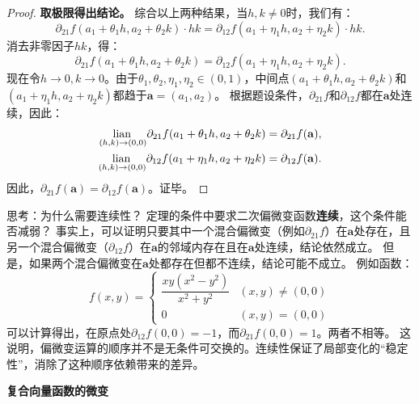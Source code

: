 \documentclass[12pt,UTF8]{ctexbook}
\begin{document}
\begin{appendix}
\begin{proof}
\textbf{取极限得出结论。}
综合以上两种结果，当$h, k \neq 0$时，我们有：
$$ \partial_{21} f(a_1 + \theta_1 h, a_2 + \theta_2 k) \cdot h k = \partial_{12} f(a_1 + \eta_1 h, a_2 + \eta_2 k) \cdot h k. $$
消去非零因子$h k$，得：
$$ \partial_{21} f(a_1 + \theta_1 h, a_2 + \theta_2 k) = \partial_{12} f(a_1 + \eta_1 h, a_2 + \eta_2 k). $$
现在令$h \to 0, k \to 0$。由于$\theta_1, \theta_2, \eta_1, \eta_2 \in (0, 1)$，中间点$(a_1 + \theta_1 h, a_2 + \theta_2 k)$和$(a_1 + \eta_1 h, a_2 + \eta_2 k)$都趋于$\mathbf{a}=(a_1, a_2)$。
根据题设条件，$\partial_{21} f$和$\partial_{12} f$都在$\mathbf{a}$处连续，因此：
\begin{align*}
\underset{(h,k)\to (0,0)}{\operatorname{lian}\,} \partial_{21} f(a_1 + \theta_1 h, a_2 + \theta_2 k) &= \partial_{21} f(\mathbf{a}), \\
\underset{(h,k)\to (0,0)}{\operatorname{lian}\,} \partial_{12} f(a_1 + \eta_1 h, a_2 + \eta_2 k) &= \partial_{12} f(\mathbf{a}).
\end{align*}
因此，$\partial_{21} f(\mathbf{a}) = \partial_{12} f(\mathbf{a})$。证毕。
\end{proof}

\begin{sk}{思考：为什么需要连续性？}
定理的条件中要求二次偏微变函数\textbf{连续}，这个条件能否减弱？
事实上，可以证明只要其中一个混合偏微变（例如$\partial_{21} f$）在$\mathbf{a}$处存在，且另一个混合偏微变（$\partial_{12} f$）在$\mathbf{a}$的邻域内存在且在$\mathbf{a}$处连续，结论依然成立。
但是，如果两个混合偏微变在$\mathbf{a}$处都存在但都不连续，结论可能不成立。
例如函数：
$$ f(x, y) = \begin{cases} \dfrac{xy(x^2-y^2)}{x^2+y^2} & (x, y) \neq (0, 0) \\ 0 & (x, y) = (0, 0) \end{cases} $$
可以计算得出，在原点处$\partial_{12} f(0, 0) = -1$，而$\partial_{21} f(0, 0) = 1$。两者不相等。
这说明，偏微变运算的顺序并不是无条件可交换的。连续性保证了局部变化的“稳定性”，消除了这种顺序依赖带来的差异。
\end{sk}

\begin{tm}{\textbf{复合向量函数的微变}}
\end{tm}


\end{appendix}
\end{document}
